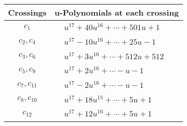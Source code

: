 \documentclass[1p]{elsarticle_modified}
\theoremstyle{definition}
\begin{document}
\begin{tabular}{m{50pt}|m{274pt}}
Crossings & \hspace{64pt}u-Polynomials at each crossing \\
\hline $$\begin{aligned}c_{1}\end{aligned}$$&$\begin{aligned}
&u^{17}+40 u^{16}+\cdots+501 u+1
\end{aligned}$\\
\hline $$\begin{aligned}c_{2},c_{4}\end{aligned}$$&$\begin{aligned}
&u^{17}-10 u^{16}+\cdots+25 u-1
\end{aligned}$\\
\hline $$\begin{aligned}c_{3},c_{6}\end{aligned}$$&$\begin{aligned}
&u^{17}+3 u^{16}+\cdots+512 u+512
\end{aligned}$\\
\hline $$\begin{aligned}c_{5},c_{9}\end{aligned}$$&$\begin{aligned}
&u^{17}+2 u^{16}+\cdots- u-1
\end{aligned}$\\
\hline $$\begin{aligned}c_{7},c_{11}\end{aligned}$$&$\begin{aligned}
&u^{17}-2 u^{16}+\cdots- u-1
\end{aligned}$\\
\hline $$\begin{aligned}c_{8},c_{10}\end{aligned}$$&$\begin{aligned}
&u^{17}+18 u^{15}+\cdots+5 u+1
\end{aligned}$\\
\hline $$\begin{aligned}c_{12}\end{aligned}$$&$\begin{aligned}
&u^{17}+12 u^{16}+\cdots+5 u+1
\end{aligned}$\\
\hline
\end{tabular}\\~\\
\newpage\renewcommand{\arraystretch}{1}
\end{document}
